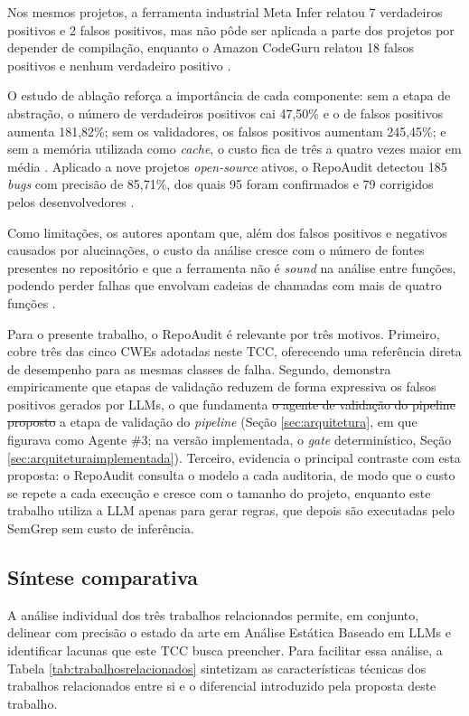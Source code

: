 \documentclass[
    12pt,                %
    openright,           %
    oneside,             %
    a4paper,             %
    english,             %
    brazil               %
]{abntex2}
\newcommand{\antigo}[1]{\sout{#1}}
\newcommand{\novo}[1]{{\color{red}#1}}
\begin{document}
Nos mesmos projetos, a ferramenta industrial Meta Infer relatou 7 verdadeiros positivos e 2 falsos positivos, mas não pôde ser aplicada a parte dos projetos por depender de compilação, enquanto o Amazon CodeGuru relatou 18 falsos positivos e nenhum verdadeiro positivo \cite{guo2025repoaudit}.
\par
O estudo de ablação reforça a importância de cada componente: sem a etapa de abstração, o número de verdadeiros positivos cai 47,50\% e o de falsos positivos aumenta 181,82\%; sem os validadores, os falsos positivos aumentam 245,45\%; e sem a memória utilizada como \textit{cache}, o custo fica de três a quatro vezes maior em média \cite{guo2025repoaudit}.
Aplicado a nove projetos \textit{open-source} ativos, o RepoAudit detectou 185 \textit{bugs} com precisão de 85,71\%, dos quais 95 foram confirmados e 79 corrigidos pelos desenvolvedores \cite{guo2025repoaudit}.
\par
Como limitações, os autores apontam que, além dos falsos positivos e negativos causados por alucinações, o custo da análise cresce com o número de fontes presentes no repositório e que a ferramenta não é \textit{sound} na análise entre funções, podendo perder falhas que envolvam cadeias de chamadas com mais de quatro funções \cite{guo2025repoaudit}.
\par
Para o presente trabalho, o RepoAudit é relevante por três motivos.
Primeiro, cobre três das cinco CWEs adotadas neste TCC, oferecendo uma referência direta de desempenho para as mesmas classes de falha.
Segundo, demonstra empiricamente que etapas de validação reduzem de forma expressiva os falsos positivos gerados por LLMs, o que fundamenta \antigo{o agente de validação do pipeline proposto} \novo{a etapa de validação do \textit{pipeline}} (Seção \ref{sec:arquitetura}\novo{, em que figurava como Agente \#3; na versão implementada, o \textit{gate} determinístico, Seção \ref{sec:arquiteturaimplementada}}).
Terceiro, evidencia o principal contraste com esta proposta: o RepoAudit consulta o modelo a cada auditoria, de modo que o custo se repete a cada execução e cresce com o tamanho do projeto, enquanto este trabalho utiliza a LLM apenas para gerar regras, que depois são executadas pelo SemGrep sem custo de inferência.
\par

\subsection{Síntese comparativa}
\par
A análise individual dos três trabalhos relacionados permite, em conjunto, delinear com precisão o estado da arte em Análise Estática Baseado em LLMs e identificar lacunas que este TCC busca preencher.
Para facilitar essa análise, a Tabela \ref{tab:trabalhosrelacionados} sintetizam as características técnicas dos trabalhos relacionados entre si e o diferencial introduzido pela proposta deste trabalho.
\end{document}
